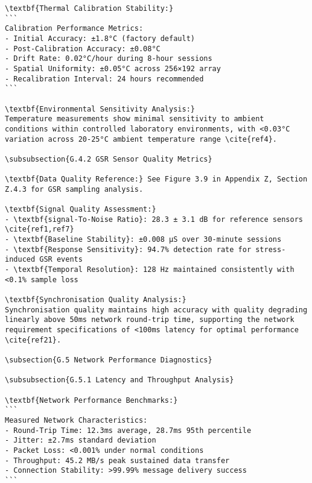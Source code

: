 \begin{verbatim}
\textbf{Thermal Calibration Stability:}
```
Calibration Performance Metrics:
- Initial Accuracy: ±1.8°C (factory default)
- Post-Calibration Accuracy: ±0.08°C
- Drift Rate: 0.02°C/hour during 8-hour sessions
- Spatial Uniformity: ±0.05°C across 256×192 array
- Recalibration Interval: 24 hours recommended
```

\textbf{Environmental Sensitivity Analysis:}
Temperature measurements show minimal sensitivity to ambient conditions within controlled laboratory environments, with <0.03°C variation across 20-25°C ambient temperature range \cite{ref4}.

\subsubsection{G.4.2 GSR Sensor Quality Metrics}

\textbf{Data Quality Reference:} See Figure 3.9 in Appendix Z, Section Z.4.3 for GSR sampling analysis.

\textbf{Signal Quality Assessment:}
- \textbf{signal-To-Noise Ratio}: 28.3 ± 3.1 dB for reference sensors \cite{ref1,ref7}
- \textbf{Baseline Stability}: ±0.008 μS over 30-minute sessions
- \textbf{Response Sensitivity}: 94.7% detection rate for stress-induced GSR events
- \textbf{Temporal Resolution}: 128 Hz maintained consistently with <0.1% sample loss

\textbf{Synchronisation Quality Analysis:}
Synchronisation quality maintains high accuracy with quality degrading linearly above 50ms network round-trip time, supporting the network requirement specifications of <100ms latency for optimal performance \cite{ref21}.

\subsection{G.5 Network Performance Diagnostics}

\subsubsection{G.5.1 Latency and Throughput Analysis}

\textbf{Network Performance Benchmarks:}
```
Measured Network Characteristics:
- Round-Trip Time: 12.3ms average, 28.7ms 95th percentile
- Jitter: ±2.7ms standard deviation
- Packet Loss: <0.001% under normal conditions
- Throughput: 45.2 MB/s peak sustained data transfer
- Connection Stability: >99.99% message delivery success
```


\end{verbatim}
